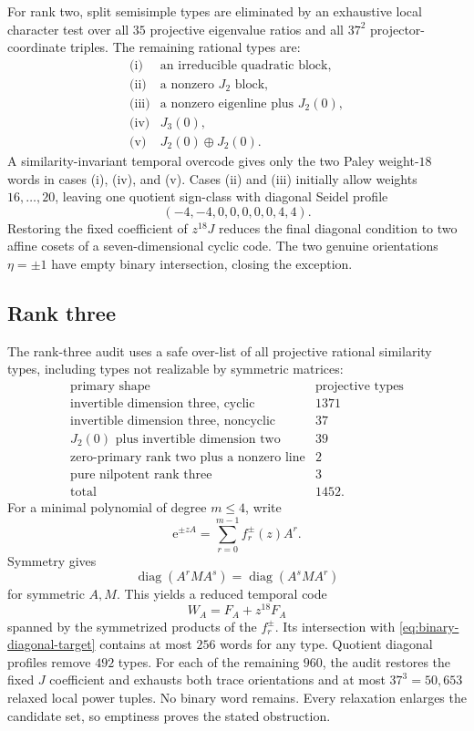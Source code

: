 \documentclass[11pt]{article}
\theoremstyle{definition}
\newcommand{\diag}{\operatorname{diag}}
\newcommand{\e}{\mathrm{e}}
\begin{document}
For rank two, split semisimple types are eliminated by an exhaustive local
character test over all \(35\) projective eigenvalue ratios and all
\(37^2\) projector-coordinate triples.  The remaining rational types are:
\[
\begin{array}{ll}
\text{(i)}&\text{an irreducible quadratic block},\\
\text{(ii)}&\text{a nonzero \(J_2\) block},\\
\text{(iii)}&\text{a nonzero eigenline plus \(J_2(0)\)},\\
\text{(iv)}&J_3(0),\\
\text{(v)}&J_2(0)\oplus J_2(0).
\end{array}
\]
A similarity-invariant temporal overcode gives only the two Paley
weight-\(18\) words in cases (i), (iv), and (v).  Cases (ii) and (iii)
initially allow weights \(16,\ldots,20\), leaving one quotient sign-class
with diagonal Seidel profile
\[
(-4,-4,0,0,0,0,0,4,4).
\]
Restoring the fixed coefficient of \(z^{18}J\) reduces the final diagonal
condition to two affine cosets of a seven-dimensional cyclic code.  The
two genuine orientations \(\eta=\pm1\) have empty binary intersection,
closing the exception.

\subsection{Rank three}

The rank-three audit uses a safe over-list of all projective rational
similarity types, including types not realizable by symmetric matrices:
\[
\begin{array}{l|r}
\text{primary shape}&\text{projective types}\\ \hline
\text{invertible dimension three, cyclic}&1371\\
\text{invertible dimension three, noncyclic}&37\\
J_2(0)\text{ plus invertible dimension two}&39\\
\text{zero-primary rank two plus a nonzero line}&2\\
\text{pure nilpotent rank three}&3\\ \hline
\text{total}&1452.
\end{array}
\tag{8.2}\label{eq:rank3-types}
\]
For a minimal polynomial of degree \(m\leq4\), write
\[
\e^{\pm zA}=\sum_{r=0}^{m-1}f_r^\pm(z)A^r.
\]
Symmetry gives
\[
\diag(A^rMA^s)=\diag(A^sMA^r)
\]
for symmetric \(A,M\).  This yields a reduced temporal code
\[
W_A=F_A+z^{18}F_A
\]
spanned by the symmetrized products of the \(f_r^\pm\).  Its intersection
with \eqref{eq:binary-diagonal-target} contains at most \(256\) words for
any type.  Quotient diagonal profiles remove \(492\) types.  For each of
the remaining \(960\), the audit restores the fixed \(J\) coefficient and
exhausts both trace orientations and at most \(37^3=50{,}653\) relaxed
local power tuples.  No binary word remains.  Every relaxation enlarges
the candidate set, so emptiness proves the stated obstruction.
\end{document}
